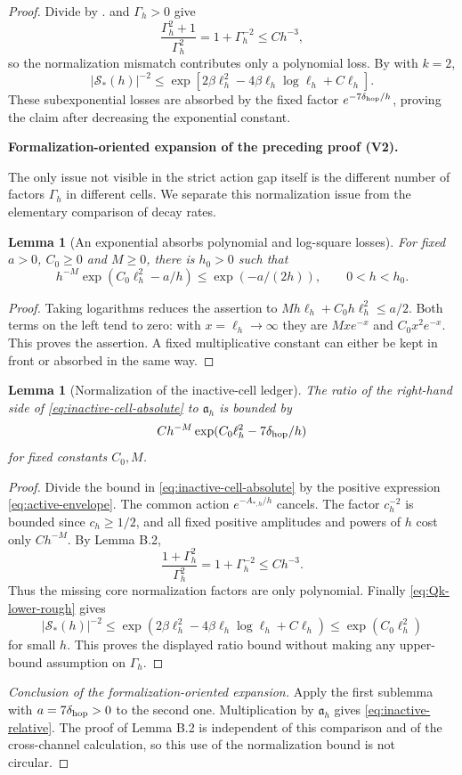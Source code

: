 \documentclass[11pt]{article}
\newtheorem{lemma}[theorem]{Lemma}
\newcommand{\formalisationparentid}{X}
\newenvironment{formalisationaddition}[1]{\par\medskip\begingroup\color{blue}\def\formalisationparentid{#1}\setcounter{formalizationsublemma}{0}\let\lemma\formalizationsublemma\let\endlemma\endformalizationsublemma
  \def\Eo{\mathcal E_h^\circ}\def\EE{\mathcal E_h}\def\phio{\phi_h^\circ}\def\phih{\phi_h}\def\Ho{H_h^{\rm atom}(v^\circ)}\def\Ha{H_h^{\rm atom}}\def\HL{H_h^{L}}\def\Dh{D_h}\def\Log{\operatorname{Log}}\def\ellh{\ell_h}\def\Gp{G_{p,h}}\def\Ast{A_{*,h}}\def\ahat{\widehat{\mathfrak a}_h}\def\ah{\mathfrak a_h}\def\rh{\widehat\rho_h}\def\deltah{\widehat\delta_h}\def\oldref##1{\textup{(##1)}}\def\interface##1{\par\noindent\textit{Analytical interface used here.} ##1\par}\def\finish{\par\noindent\textit{Conclusion of the formalization-oriented expansion.} }\par\noindent\textbf{Formalization-oriented expansion of the preceding proof (V2).}\par\smallskip
}{\par\endgroup\medskip
}
\begin{document}
\begin{proof}
Divide  by
.   and $\Gamma_h>0$ give
\[
 \frac{\Gamma_h^2+1}{\Gamma_h^2}
 =1+\Gamma_h^{-2}\le Ch^{-3},
\]
so the normalization mismatch contributes only a polynomial loss.  By
 with $k=2$,
\[
 |\mathcal S_*(h)|^{-2}
 \le \exp\!\left[
 2\beta\ell_h^2-4\beta\ell_h\log\ell_h+C\ell_h
 \right].
\]
These subexponential losses are absorbed by the fixed factor
$e^{-7\delta_{\rm hop}/h}$, proving the claim after decreasing the exponential
constant.

\begin{formalisationaddition}{L7.1}
The only issue not visible in the strict action gap itself is the different number of factors $\Gamma_h$ in different cells. We separate this normalization issue from the elementary comparison of decay rates.

\begin{lemma}[An exponential absorbs polynomial and log-square losses]\label{sublemma:L7-1-absorption}
For fixed $a>0$, $C_0\ge0$ and $M\ge0$, there is $h_0>0$ such that
\[
 h^{-M}\exp(C_0\ellh^2-a/h)\le \exp(-a/(2h)),\qquad 0<h<h_0.
\]
\end{lemma}
\begin{proof}
Taking logarithms reduces the assertion to $Mh\ellh+C_0h\ellh^2\le a/2$. Both terms on the left tend to zero: with $x=\ellh\to\infty$ they are $Mx e^{-x}$ and $C_0x^2e^{-x}$. This proves the assertion. A fixed multiplicative constant can either be kept in front or absorbed in the same way.
\end{proof}

\begin{lemma}[Normalization of the inactive-cell ledger]\label{sublemma:L7-1-ratio}
The ratio of the right-hand side of \eqref{eq:inactive-cell-absolute} to $\ah$ is bounded by
\[
 Ch^{-M}\exp(C_0\ellh^2-7\delta_{\rm hop}/h)
\]
for fixed constants $C_0,M$.
\end{lemma}
\begin{proof}
Divide the bound in \eqref{eq:inactive-cell-absolute} by the positive expression \eqref{eq:active-envelope}. The common action $e^{-\Ast/h}$ cancels. The factor $c_h^{-2}$ is bounded since $c_h\ge1/2$, and all fixed positive amplitudes and powers of $h$ cost only $Ch^{-M}$. By Lemma B.2,
\[
 \frac{1+\Gamma_h^2}{\Gamma_h^2}=1+\Gamma_h^{-2}\le Ch^{-3}.
\]
Thus the missing core normalization factors are only polynomial. Finally \eqref{eq:Qk-lower-rough} gives
\[
 |\mathcal S_*(h)|^{-2}\le
 \exp(2\beta\ellh^2-4\beta\ellh\log\ellh+C\ellh)
 \le \exp(C_0\ellh^2)
\]
for small $h$. This proves the displayed ratio bound without making any upper-bound assumption on $\Gamma_h$.
\end{proof}
\finish Apply the first sublemma with $a=7\delta_{\rm hop}>0$ to the second one. Multiplication by $\ah$ gives \eqref{eq:inactive-relative}. The proof of Lemma B.2 is independent of this comparison and of the cross-channel calculation, so this use of the normalization bound is not circular.
\end{formalisationaddition}

\end{proof}
\end{document}
